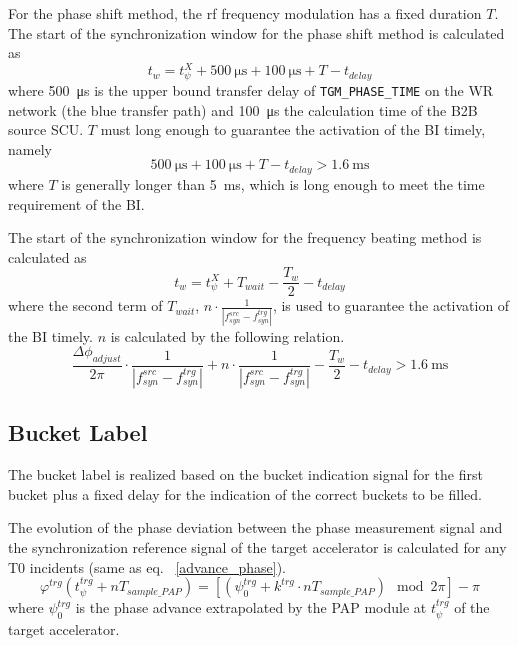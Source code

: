 For the phase shift method, the rf frequency modulation has a fixed duration $T$. The start of the synchronization window for the phase shift method is calculated as
\begin{equation}
t_\mathit{w}=t_\psi^\mathit{X}+\SI{500}{\us}+\SI{100}{\us}+T-t_\mathit{delay}\label{syn_win_start}
\end{equation}
where \SI{500}{\us} is the upper bound transfer delay of \verb|TGM_PHASE_TIME| on the WR network (the blue transfer path) and \SI{100}{\us} the calculation time of the B2B source SCU. $T$ must long enough to guarantee the activation of the BI timely, namely
\begin{equation}
\SI{500}{\us}+\SI{100}{\us}+T-t_\mathit{delay}> \SI{1.6}{\ms}
\end{equation}
where $T$ is generally longer than \SI{5}{\ms}, which is long enough to meet the time requirement of the BI. 

The start of the synchronization window for the frequency beating method is calculated as
\begin{equation}
t_\mathit{w}= t_\psi^\mathit{X}+T_\mathit{wait}-\frac{T_w}{2}-t_\mathit{delay}\label{syn_win_start1}
\end{equation}
where the second term of $T_\mathit{wait}$, $n\cdot \frac{1}{|f_{\mathit{syn}}^\mathit{src}-f_{\mathit{syn}}^\mathit{trg}|}$, is used to guarantee the activation of the BI timely. $n$ is calculated by the following relation.
\begin{equation}
\frac{\Delta \phi_\mathit{adjust}}{2\pi}\cdot\frac{1}{|f_{\mathit{syn}}^\mathit{src}-f_{\mathit{syn}}^\mathit{trg}|}+n\cdot \frac{1}{|f_{\mathit{syn}}^\mathit{src}-f_{\mathit{syn}}^\mathit{trg}|}-\frac{T_w}{2}-t_\mathit{delay}> \SI{1.6}{\ms}
\end{equation}


\subsection{Bucket Label}
\label{sec:bucket_label}
The bucket label is realized based on the bucket indication signal for the first bucket plus a fixed delay for the indication of the correct buckets to be filled. 

The evolution of the phase deviation between the phase measurement signal and the synchronization reference signal of the target accelerator is calculated for any T0 incidents (same as eq. ~\ref{advance_phase}).
\begin{equation}
\varphi^\mathit{trg}(t_\mathit{\psi}^\mathit{trg}+nT_\mathit{sample\_PAP})=[(\psi^\mathit{trg}_0+k^\mathit{trg}\cdot nT_\mathit{sample\_PAP}) \mod 2\pi] - \pi
\end{equation}
where $\psi^\mathit{trg}_0$ is the phase advance extrapolated by the PAP module at $t_\mathit{\psi}^\mathit{trg}$ of the target accelerator.


